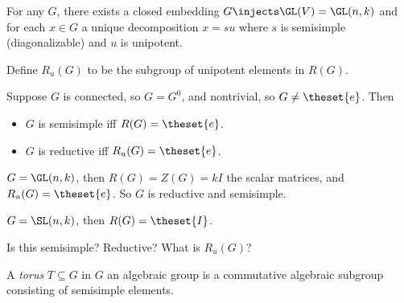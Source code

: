 \begin{proposition}[JC Decomposition]

For any \(G\), there exists a closed embedding
\(G\injects \GL(V) = \GL(n , k)\) and for each \(x\in G\) a unique
decomposition \(x=su\) where \(s\) is semisimple (diagonalizable) and
\(u\) is unipotent.

\end{proposition}

Define \(R_u(G)\) to be the subgroup of unipotent elements in \(R(G)\).

\begin{definition}

\hfill

Suppose \(G\) is connected, so \(G = G^0\), and nontrivial, so
\(G\neq \theset{e}\). Then

\begin{itemize}
\tightlist
\item
  \(G\) is semisimple iff \(R(G) = \theset{e}\).
\item
  \(G\) is reductive iff \(R_u(G) = \theset{e}\).
\end{itemize}

\end{definition}

\begin{example}

\(G = \GL(n, k)\), then \(R(G) = Z(G) = kI\) the scalar matrices, and
\(R_u(G) = \theset{e}\). So \(G\) is reductive and semisimple.

\end{example}

\begin{example}

\(G = \SL(n , k)\), then \(R(G) = \theset{I}\).

\begin{exercise}

Is this semisimple? Reductive? What is \(R_u(G)\)?

\end{exercise}

\end{example}

\begin{definition}[Torus]

A \emph{torus} \(T\subseteq G\) in \(G\) an algebraic group is a
commutative algebraic subgroup consisting of semisimple elements.

\end{definition}


